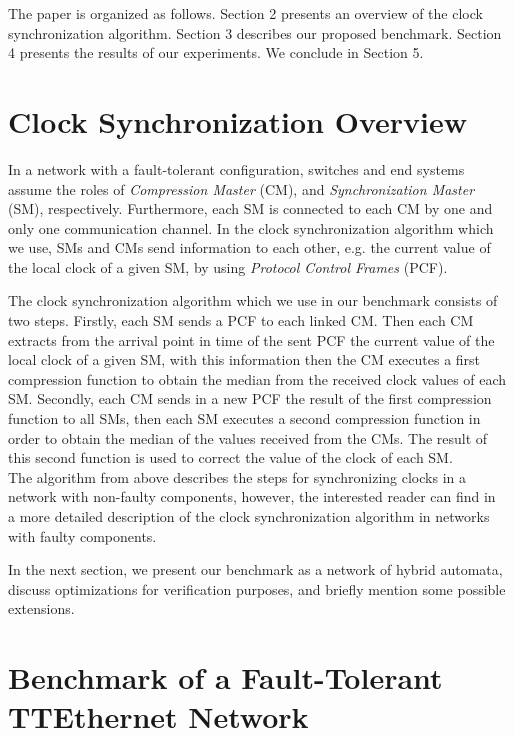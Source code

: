 The paper is organized as follows. Section 2 presents an overview of the
clock synchronization algorithm. Section 3 describes our proposed benchmark. 
Section 4 presents the results of our experiments. We conclude in Section 5.
  
\section{Clock Synchronization Overview}
\label{sec:clocksyncoverview}

In a network with a fault-tolerant configuration, switches and end systems assume 
the roles of \emph{Compression Master} (CM), and \emph{Synchronization Master} (SM), 
respectively. Furthermore, each SM is connected to each CM by one and only one communication channel.
In the clock synchronization algorithm which we use, SMs and CMs send information to each other, 
e.g. the current value of the local clock of a given SM, by using \emph{Protocol Control Frames} (PCF).

The clock synchronization algorithm which we use in our benchmark consists of two steps. Firstly, 
each SM sends a PCF to each linked CM. Then each CM extracts from the arrival point in time
of the sent PCF the current value of the local clock of a given SM, 
with this information then the CM executes a first compression function to obtain the median 
from the received clock values of each SM. Secondly, each CM sends in a new PCF the result of 
the first compression function to all SMs, then each SM executes a second compression function
in order to obtain the median of the values received from the CMs. The result of this 
second function is used to correct the value of the clock of each SM. \\
%
The algorithm from above describes the steps for synchronizing clocks in a  
network with non-faulty components, however, the interested reader can find 
in~\cite{Steiner2} a more detailed description of the clock synchronization 
algorithm in networks with faulty components.  

In the next section, we present our benchmark as a network of hybrid automata, 
discuss optimizations for verification purposes, and briefly mention
some possible extensions. 

\section{Benchmark of a Fault-Tolerant TTEthernet Network}

